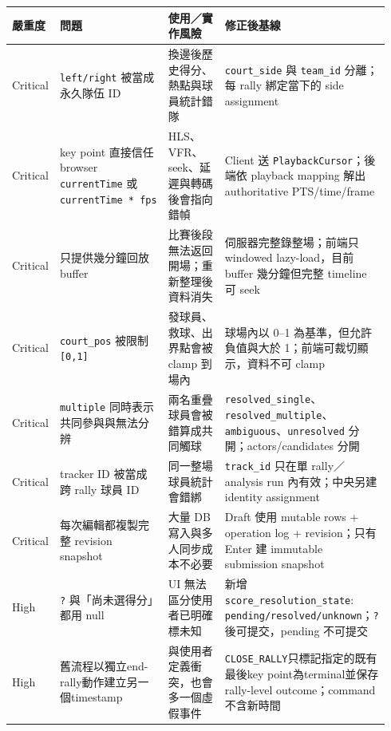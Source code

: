 \documentclass[
  9pt,
  a4paper,
]{article}
\begin{document}
\begin{longtable}[]{@{}>{\RaggedRight\arraybackslash}p{0.11\linewidth}>{\RaggedRight\arraybackslash}p{0.19\linewidth}>{\RaggedRight\arraybackslash}p{0.31\linewidth}>{\RaggedRight\arraybackslash}p{0.33\linewidth}@{}}
\toprule\noalign{}
嚴重度 & 問題 & 使用／實作風險 & 修正後基線 \\
\midrule\noalign{}
\endhead
\bottomrule\noalign{}
\endlastfoot
Critical & \texttt{left/right} 被當成永久隊伍 ID &
換邊後歷史得分、熱點與球員統計錯隊 & \texttt{court\_\allowbreak{}side} 與
\texttt{team\_\allowbreak{}id} 分離；每 rally 綁定當下的 side assignment \\
Critical & key point 直接信任 browser \texttt{currentTime} 或
\texttt{currentTime\ *\ fps} & HLS、VFR、seek、延遲與轉碼後會指向錯幀 &
Client 送 \texttt{PlaybackCursor}；後端依 playback mapping 解出
authoritative PTS/time/frame \\
Critical & 只提供幾分鐘回放 buffer &
比賽後段無法返回開場；重新整理後資料消失 & 伺服器完整錄整場；前端只
windowed lazy-load，目前 buffer 幾分鐘但完整 timeline 可 seek \\
Critical & \texttt{court\_\allowbreak{}pos} 被限制 \texttt{{[}0,1{]}} &
發球員、救球、出界點會被 clamp 到場內 & 球場內以 0--1
為基準，但允許負值與大於 1；前端可裁切顯示，資料不可 clamp \\
Critical & \texttt{multiple} 同時表示共同參與與無法分辨 &
兩名重疊球員會被錯算成共同觸球 &
\texttt{resolved\_\allowbreak{}single}、\texttt{resolved\_\allowbreak{}multiple}、\texttt{ambiguous}、\texttt{unresolved}
分開；actors/candidates 分開 \\
Critical & tracker ID 被當成跨 rally 球員 ID & 同一整場球員統計會錯綁 &
\texttt{track\_\allowbreak{}id} 只在單 rally／analysis run 內有效；中央另建 identity
assignment \\
Critical & 每次編輯都複製完整 revision snapshot & 大量 DB
寫入與多人同步成本不必要 & Draft 使用 mutable rows + operation log +
revision；只有 Enter 建 immutable submission snapshot \\
High & \texttt{?} 與「尚未選得分」都用 null & UI
無法區分使用者已明確標未知 & 新增 \texttt{score\_\allowbreak{}resolution\_\allowbreak{}state}:
\texttt{pending/resolved/unknown}；\texttt{?} 後可提交，pending
不可提交 \\
High & 舊流程以獨立end-rally動作建立另一個timestamp &
與使用者定義衝突，也會多一個虛假事件 &
\texttt{CLOSE\_\allowbreak{}RALLY}只標記指定的既有最後key point為terminal並保存rally-level
outcome；command不含新時間 \\

\end{longtable}
\end{document}
